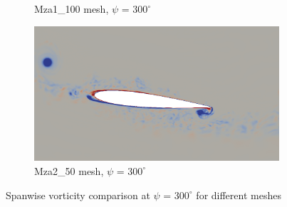 \begin{figure}[H]
\begin{subfigure}[b]{0.475\textwidth}
		\caption{Mza1\_100 mesh, $\psi$ = $300^\circ$}
		\label{fig:Mza1_100_Re200k_sp_psi300}
	\end{subfigure}
	\begin{subfigure}[b]{0.475\textwidth}
		\centering
		\includegraphics[width=1\textwidth]{figures/zonal_adapt_results/vorticity_plots_Re200k/Mza2_50/phase_300.png}
		\caption{Mza2\_50 mesh, $\psi$ = $300^\circ$}
		\label{fig:Mza2_50_Re200k_sp_psi300}
	\end{subfigure}	
	\caption{Spanwise vorticity comparison at $\psi$ = $300^\circ$ for different meshes}
	\label{fig:vorticity_Re200k_sp_300}
\end{figure}


